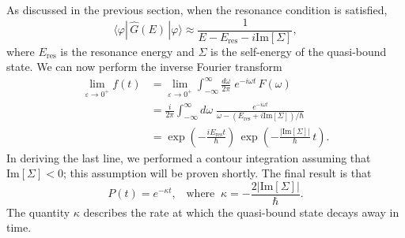 \documentclass[pra,12pt]{revtex4}
\begin{document}
As discussed in the previous section, when the resonance condition is
satisfied,
$$ \langle\varphi|\,\hat{G}(E)\,|\varphi\rangle \approx \frac{1}{\displaystyle E - E_{\mathrm{res}} - i \mathrm{Im}[\Sigma]},$$
where $E_{\mathrm{res}}$ is the resonance energy and $\Sigma$ is the
self-energy of the quasi-bound state.  We can now perform the
inverse Fourier transform
$$\begin{aligned} \lim_{\varepsilon\rightarrow 0^+} f(t) &= \lim_{\varepsilon\rightarrow 0^+} \int_{-\infty}^{\infty} \frac{d\omega}{2\pi} \; e^{-i\omega t} \, F(\omega) \\ &= \frac{i}{2\pi} \int_{-\infty}^{\infty} d\omega\; \frac{e^{-i\omega t}}{\omega - (E_{\mathrm{res}}+i \mathrm{Im}[\Sigma])/\hbar}\\ &= \exp\left(-\frac{iE_{\mathrm{res}}t}{\hbar}\right)\, \exp\left(-\frac{|\mathrm{Im}[\Sigma]|}{\hbar}\,t\right). \end{aligned}$$
In deriving the last line, we performed a contour integration assuming
that $\mathrm{Im}[\Sigma] < 0$; this assumption will be proven
shortly.  The final result is that
$$P(t) = e^{-\kappa t}, \;\;\;\mathrm{where}\;\;\kappa = -\frac{2|\mathrm{Im}[\Sigma]|}{\hbar}.$$
The quantity $\kappa$ describes the rate at which the quasi-bound
state decays away in time.
\end{document}
